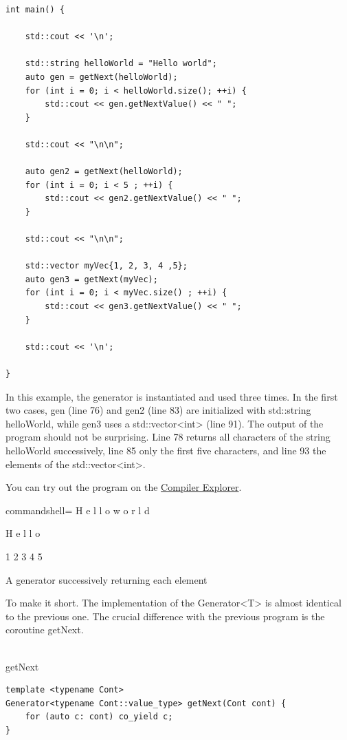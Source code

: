 \begin{lstlisting}[style=styleCXX]
int main() {

	std::cout << '\n';
	
	std::string helloWorld = "Hello world";
	auto gen = getNext(helloWorld);
	for (int i = 0; i < helloWorld.size(); ++i) {
		std::cout << gen.getNextValue() << " ";
	}
	
	std::cout << "\n\n";
	
	auto gen2 = getNext(helloWorld);
	for (int i = 0; i < 5 ; ++i) {
		std::cout << gen2.getNextValue() << " ";
	}
	
	std::cout << "\n\n";
	
	std::vector myVec{1, 2, 3, 4 ,5};
	auto gen3 = getNext(myVec);
	for (int i = 0; i < myVec.size() ; ++i) {
		std::cout << gen3.getNextValue() << " ";
	}
	
	std::cout << '\n';

}
\end{lstlisting}

In this example, the generator is instantiated and used three times. In the first two cases, gen (line 76) and gen2 (line 83) are initialized with std::string helloWorld, while gen3 uses a std::vector<int> (line 91). The output of the program should not be surprising. Line 78 returns all characters of the string helloWorld successively, line 85 only the first five characters, and line 93 the elements of the std::vector<int>.

You can try out the program on the \href{https://godbolt.org/z/j9znva}{Compiler Explorer}.

\begin{tcblisting}{commandshell={}}
H e l l o  w o r l d

H e l l o

1 2 3 4 5
\end{tcblisting}

\begin{center}
A generator successively returning each element
\end{center}

To make it short. The implementation of the Generator<T> is almost identical to the previous one. The crucial difference with the previous program is the coroutine getNext.

\hspace*{\fill} \\ %
\noindent
getNext
\begin{lstlisting}[style=styleCXX]
template <typename Cont>
Generator<typename Cont::value_type> getNext(Cont cont) {
	for (auto c: cont) co_yield c;
}
\end{lstlisting}

